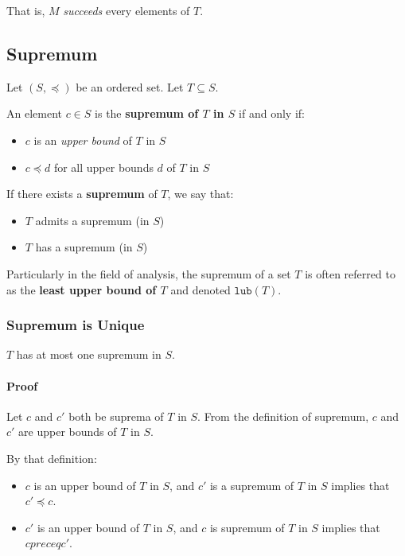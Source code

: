 That is, $M$ \textit{succeeds} every elements of $T$.



\subsection{Supremum}

Let $(S, \preceq)$ be an ordered set. Let $T \subseteq S$.

An element $c \in S$ is the \textbf{supremum of $T$ in $S$} if and
only if:

\begin{itemize}
\item $c$ is an \textit{upper bound} of $T$ in $S$
\item $c \preceq d$ for all upper bounds $d$ of $T$ in $S$
\end{itemize}

If there exists a \textbf{supremum} of $T$, we say that:

\begin{itemize}
\item $T$ admits a supremum (in $S$)
\item $T$ has a supremum (in $S$)
\end{itemize}


Particularly in the field of analysis, the supremum of a set $T$ is
often referred to as the \textbf{least upper bound of $T$} and denoted
$\mathtt{lub}(T)$.


\subsubsection{Supremum is Unique}

$T$ has at most one supremum in $S$.

\paragraph{Proof}

Let $c$ and $c'$ both be suprema of $T$ in $S$. From the definition of
supremum, $c$ and $c'$ are upper bounds of $T$ in $S$.

By that definition:

\begin{itemize}
\item $c$ is an upper bound of $T$ in $S$, and $c'$ is a supremum of $T$ in $S$ implies that $c' \preceq c$.
\item $c'$ is an upper bound of $T$ in $S$, and $c$ is supremum of $T$ in $S$ implies that $c preceq c'$.
\end{itemize}


